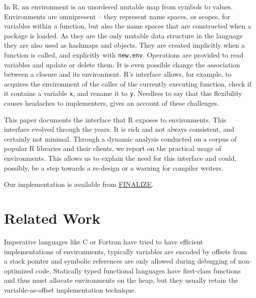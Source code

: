 \documentclass[10pt,review,sigplan,authorversion=true]{acmart}
\renewcommand{\c}[1]{\lstinline |#1|\xspace}
\begin{document}
In R, an environment is an unordered mutable map from symbols to values.
Environments are omnipresent -- they represent name spaces, or scopes, for
variables within a function, but also the name spaces that are constructed when
a package is loaded. As they are the only mutable data structure in the language
they are also used as hashmaps and objects. They are created implicitly when a
function is called, and explicitly with \c{new.env}. Operations are provided to
read variables and update or delete them. It is even possible change the
association between a closure and its environment. R's interface allows, for
example, to acquires the environment of the caller of the currently executing
function, check if it contains a variable \c{x}, and rename it to \c{y}.
Needless to say that this flexibility causes headaches to implementers,
\citet{dls19} gives an account of these challenges.

This paper documents the interface that R exposes to environments. This
interface evolved through the years. It is rich and not always consistent, and
certainly not minimal. Through a dynamic analysis conducted on a corpus of
popular R libraries and their clients, we report on the practical usage of
environments. This allows us to explain the need for this interface and could,
possibly, be a step towards a re-design or a warning for compiler writers.

\vspace{2mm}

\noindent Our implementation is available from \url{FINALIZE}.

\newpage

\section{Related Work}

Imperative languages like C or Fortran have tried to have efficient
implementations of environments, typically variables are encoded by offsets from
a stack pointer and symbolic references are only allowed during debugging of
non-optimized code. Statically typed functional languages have first-class
functions and thus must allocate environments on the heap, but they usually
retain the variable-as-offset implementation technique.
\end{document}
